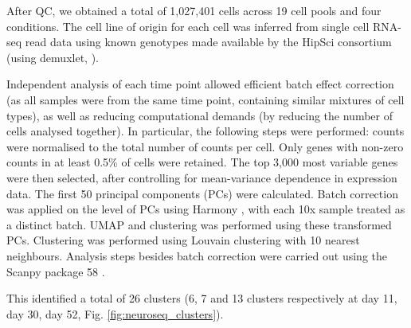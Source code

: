 After QC, we obtained a total of 1,027,401 cells across 19 cell pools and four conditions. 
The cell line of origin for each cell was inferred from single cell RNA-seq read data using known genotypes made available by the HipSci consortium (using demuxlet, \cite{kang2018multiplexed}). 

Independent analysis of each time point allowed efficient batch effect correction (as all samples were from the same time point, containing similar mixtures of cell types), as well as reducing computational demands (by reducing the number of cells analysed together).
In particular, the following steps were performed: counts were normalised to the total number of counts per cell. 
Only genes with non-zero counts in at least 0.5\% of cells were retained. 
The top 3,000 most variable genes were then selected, after controlling for mean-variance dependence in expression data. 
The first 50 principal components (PCs) were calculated. 
Batch correction was applied on the level of PCs using Harmony \cite{korsunsky2019fast}, with each 10x sample treated as a distinct batch. 
UMAP and clustering was performed using these transformed PCs. 
Clustering was performed using Louvain clustering \cite{blondel2008fast} with 10 nearest neighbours. 
Analysis steps besides batch correction were carried out using the Scanpy package 58 \cite{wolf2018scanpy}. 

This identified a total of 26 clusters (6, 7 and 13 clusters respectively at day 11, day 30, day 52, Fig. \ref{fig:neuroseq_clusters}). 

